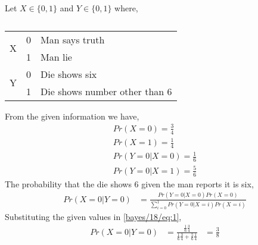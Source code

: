 Let $X \in \{0,1\}$ and $Y \in \{0,1\}$ where,
\begin{table}[ht!]
\begin{tabular}{|l|l|l|}
\hline
\multirow{2}{*}{X} & 0 &  Man says truth\\ \cline{2-3} 
                   & 1 &  Man lie\\ \hline
\multirow{2}{*}{Y} & 0 &  Die shows six     \\ \cline{2-3} 
                   & 1 & Die shows number other than 6    \\ \hline
\end{tabular}
\caption{}
\label{bayes/18/table}
\end{table}
From the given information we have,
\begin{align}
    Pr(X=0) = \frac{3}{4} \\
    Pr(X=1) = \frac{1}{4} \\
    Pr(Y=0|X=0) = \frac{1}{6} \\
    Pr(Y=0|X=1) = \frac{5}{6}
\end{align}
The probability that the die shows 6 given the man reports it is six,
\begin{align}
Pr(X=0|Y=0)&= \frac{Pr(Y=0|X=0)Pr(X=0)}{\sum_{i=0}^{1}{Pr}(Y=0|X=i)Pr(X=i)} \label{bayes/18/eq:1}
\end{align}
Substituting the given values in \eqref{bayes/18/eq:1},
\begin{align}
  Pr(X=0|Y=0)&=\frac{\frac{1}{6}\frac{3}{4}}{\frac{1}{6}\frac{3}{4}+\frac{5}{6}\frac{1}{4}} 
  &= \frac{3}{8}
\end{align}
